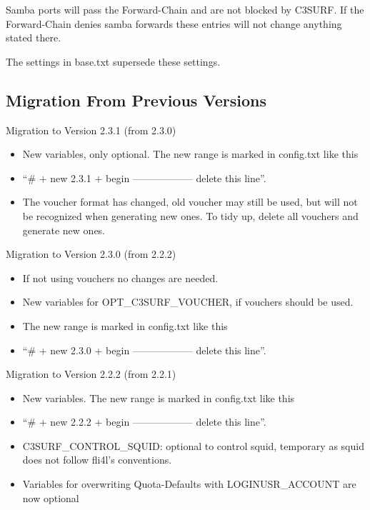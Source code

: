 Samba ports will pass the Forward-Chain and are not blocked by C3SURF.
If the Forward-Chain denies samba forwards these entries will not change
anything stated there.

The settings in base.txt supersede these settings.

\subsection{Migration From Previous Versions}

\item Migration to Version 2.3.1 (from 2.3.0)
     \begin{itemize}
     \item New variables, only optional. The new range is marked in config.txt like this
     \item ``\# $+$ new 2.3.1 $+$ begin ------------------ delete this line''.
     \item The voucher format has changed, old voucher may still be used,
           but will not be recognized when generating new ones.
           To tidy up, delete all vouchers and generate new ones.
     \end{itemize}

\item Migration to Version 2.3.0 (from 2.2.2)
    \begin{itemize}
    \item If not using vouchers no changes are needed.
    \item New variables for OPT\_C3SURF\_VOUCHER, if vouchers should be used.
    \item The new range is marked in config.txt like this
    \item ``\# $+$ new 2.3.0 $+$ begin ------------------ delete this line''.
\end{itemize}

\item Migration to Version 2.2.2 (from 2.2.1)
    \begin{itemize}
    \item New variables. The new range is marked in config.txt like this
    \item ``\# $+$ new 2.2.2 $+$ begin ------------------ delete this line''.
    \item C3SURF\_CONTROL\_SQUID: optional to control squid, temporary as squid does not follow fli4l's conventions.
    \item Variables for overwriting Quota-Defaults with LOGINUSR\_ACCOUNT are now optional
\end{itemize}

